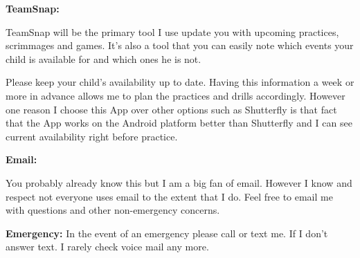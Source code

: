 \documentclass[10pt,letterpaper]{article}
\newenvironment{agendablock}[1]{%
    \tcolorbox[beamer,%
    noparskip,breakable,
    colback=LightGray,colframe=Black,%
    colbacklower=Gray!75!LightGray,%
    title=#1]}%
    {\endtcolorbox}
\newenvironment{evenBlock}[1]{%
    \tcolorbox[beamer,%
    noparskip,breakable,
    colback=LightGreen,colframe=DarkGreen,%
    colbacklower=LimeGreen!75!LightGreen,%
    title=#1]}%
    {\endtcolorbox}
\begin{document}
\begin{evenBlock}{Communication Preferences}
    
    \textbf{TeamSnap:}

    TeamSnap will be the primary tool I use update you with upcoming practices, scrimmages and games.  It's also a tool that you can easily note which events your child is available for and which ones he is not.  

    Please keep your child's availability up to  date.  Having this information a week or more in advance allows me to plan the practices and drills accordingly.  However one reason I choose this App over other options such as Shutterfly is that fact that the App works on the Android platform better than Shutterfly and I can see current availability right before practice.
    
    \textbf{Email:}
    
    You probably already know this but I am a big fan of email.  However I know and respect not everyone uses email to the extent that I do.  Feel free to email me with questions and other non-emergency concerns.

    \textbf{Emergency:}
    In the event of an emergency please call or text me.  If I don't answer text.  I rarely check voice mail any more.
\end{evenBlock}

\begin{agendablock}{Questions}
    
\end{agendablock}
\end{document}
